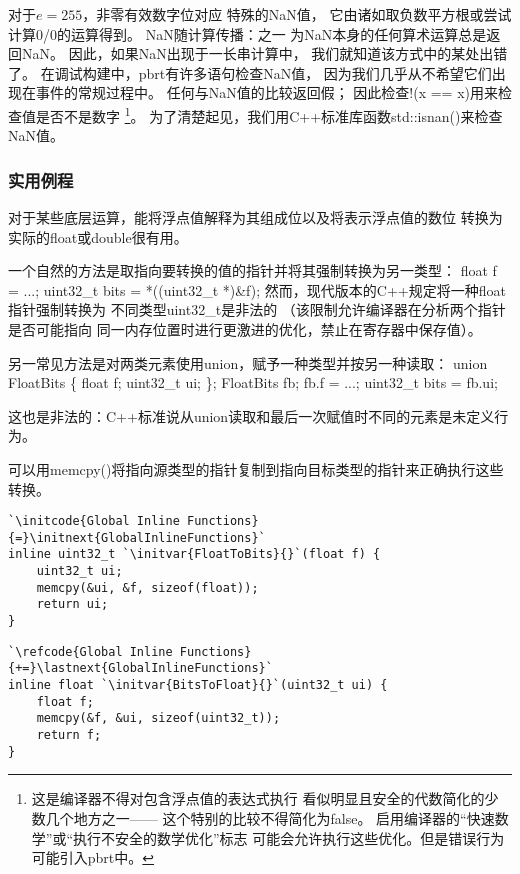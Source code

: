 对于$e=255$，非零有效数字位对应
特殊的NaN值，
它由诸如取负数平方根或尝试计算0/0的运算得到。
NaN随计算传播：之一
为NaN本身的任何算术运算总是返回NaN。
因此，如果NaN出现于一长串计算中，
我们就知道该方式中的某处出错了。
在调试构建中，pbrt有许多语句检查NaN值，
因为我们几乎从不希望它们出现在事件的常规过程中。
任何与NaN值的比较返回假；
因此检查{\ttfamily !(x == x)}用来检查值是否不是数字
\footnote{这是编译器不得对包含浮点值的表达式执行
看似明显且安全的代数简化的少数几个地方之一——
这个特别的比较不得简化为{\ttfamily false}。
启用编译器的“快速数学”或“执行不安全的数学优化”标志
可能会允许执行这些优化。但是错误行为可能引入pbrt中。}。
为了清楚起见，我们用C++标准库函数{\ttfamily std::isnan()}来检查NaN值。

\subsubsection*{实用例程}
对于某些底层运算，能将浮点值解释为其组成位以及将表示浮点值的数位
转换为实际的{\ttfamily float}或{\ttfamily double}很有用。

一个自然的方法是取指向要转换的值的指针并将其强制转换为另一类型：
{\ttfamily\newline\noindent
float f = ...;\newline\noindent
uint32\_t bits = *((uint32\_t *)\&f);\newline
}
然而，现代版本的C++规定将一种{\ttfamily float}指针强制转换为
不同类型{\ttfamily uint32\_t}是非法的
（该限制允许编译器在分析两个指针是否可能指向
同一内存位置时进行更激进的优化，禁止在寄存器中保存值）。

另一常见方法是对两类元素使用{\ttfamily union}，赋予一种类型并按另一种读取：
{\ttfamily\newline\noindent
union FloatBits \{\newline\noindent
\indent float f;\newline\noindent
\indent uint32\_t ui;\newline\noindent
\};\newline\noindent
FloatBits fb;\newline\noindent
fb.f = ...;\newline\noindent
uint32\_t bits = fb.ui;
}

这也是非法的：C++标准说从{\ttfamily union}读取和最后一次赋值时不同的元素是未定义行为。

可以用{\ttfamily memcpy()}将指向源类型的指针复制到指向目标类型的指针来正确执行这些转换。
\begin{lstlisting}
`\initcode{Global Inline Functions}{=}\initnext{GlobalInlineFunctions}`
inline uint32_t `\initvar{FloatToBits}{}`(float f) {
    uint32_t ui;
    memcpy(&ui, &f, sizeof(float));
    return ui;
}
\end{lstlisting}
\begin{lstlisting}
`\refcode{Global Inline Functions}{+=}\lastnext{GlobalInlineFunctions}`
inline float `\initvar{BitsToFloat}{}`(uint32_t ui) {
    float f;
    memcpy(&f, &ui, sizeof(uint32_t));
    return f;
}
\end{lstlisting}

